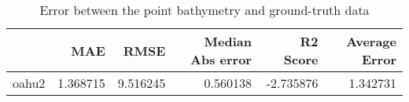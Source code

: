 \begin{table}[h!]
\caption{Error between the point bathymetry and ground-truth data}
\label{tab:oahu2_lidar_error}
\begin{tabular}{lrrrrr}
\toprule
 & MAE & RMSE & Median Abs error & R2 Score & Average Error \\
\midrule
oahu2 & 1.368715 & 9.516245 & 0.560138 & -2.735876 & 1.342731 \\
\bottomrule
\end{tabular}
\end{table}
